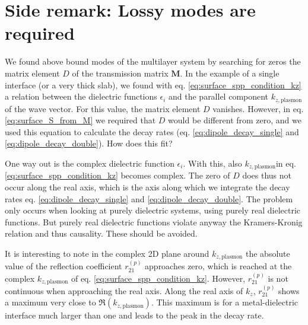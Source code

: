 \section{Side remark: Lossy modes are required}

We found above bound modes of the multilayer system by searching for zeros the matrix element $D$ of the transmission matrix $\mathbf{M}$. In the example of a single interface (or a very thick slab), we found with eq. \ref{eq:surface_spp_condition_kz} a relation between the dielectric functions $\epsilon_i$ and the  parallel component $k_{z, \text{plasmon}}$ of the wave vector. For this value, the matrix element $D$ vanishes. However, in eq.\ref{eq:surface_S_from_M} we required that $D$ would be different from zero, and we used this equation to calculate the decay rates (eq. \ref{eq:dipole_decay_single} and \ref{eq:dipole_decay_double}). How does this fit?



One way out is the complex dielectric function $\epsilon_i$. With this, also   $k_{z, \text{plasmon}}$in eq. \ref{eq:surface_spp_condition_kz} becomes complex. The zero of $D$ does thus not occur along the real axis, which is the axis along which we integrate the decay rates eq. \ref{eq:dipole_decay_single} and \ref{eq:dipole_decay_double}.
The problem only occurs when looking at purely dielectric systems, using purely real dielectric functions. But purely real dielectric functions violate anyway the Kramers-Kronig relation and thus causality. These should be avoided.

It is interesting to note in the complex 2D plane around   $k_{z, \text{plasmon}}$ the absolute value of the 
reflection coefficient $r_{21}^{(p)}$ approaches zero, which is reached  at the complex  $k_{z, \text{plasmon}}$ of eq. \ref{eq:surface_spp_condition_kz}. 
However,  $r_{21}^{(p)}$  is not continuous when approaching the real axis. Along the real axis of $k_z$, $r_{21}^{(p)}$ shows a maximum very close to $\Re( k_{z, \text{plasmon}})$. This maximum is for a metal-dielectric interface much larger than one and leads to the peak in the decay rate.





\printbibliography[segment=\therefsegment,heading=subbibliography]

